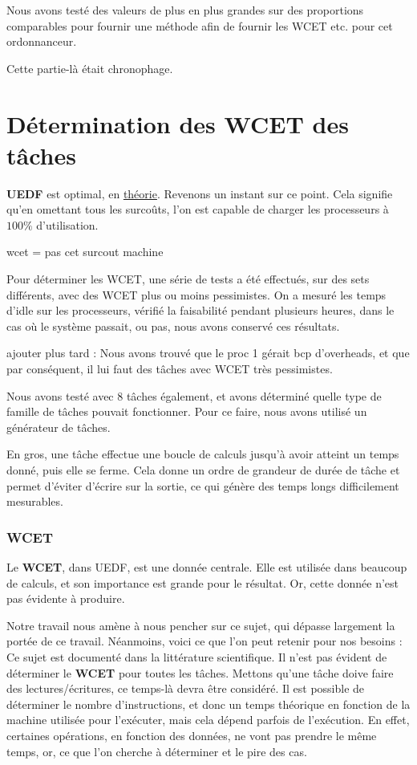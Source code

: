 	Nous avons testé des valeurs de plus en plus grandes sur des proportions comparables pour fournir 
	une méthode afin de fournir les WCET etc. pour cet ordonnanceur.
	
	Cette partie-là était chronophage.

\section{Détermination des WCET des tâches}
	\textbf{UEDF} est optimal, en \underline{théorie}. Revenons un instant sur ce point. 
	Cela signifie qu'en omettant tous les surcoûts, l'on est capable de charger les processeurs 
	à $100\%$ d'utilisation. 
	
	wcet = pas cet
	surcout
	machine

Pour déterminer les WCET, une série de tests a été effectués, sur des sets différents, 
avec des WCET plus ou moins pessimistes. 
On a mesuré les temps d'idle sur les processeurs, 
vérifié la faisabilité pendant plusieurs heures, 
dans le cas où le système passait, ou pas, nous avons conservé ces résultats.

ajouter plus tard :
Nous avons trouvé que le proc 1 gérait bcp d'overheads, et que par conséquent, il
lui faut des tâches avec WCET très pessimistes.

Nous avons testé avec 8 tâches également, et avons déterminé quelle 
type de famille de tâches pouvait fonctionner. Pour ce faire, nous avons utilisé un 
générateur de tâches.

En gros, une tâche effectue une boucle de calculs jusqu'à avoir atteint un temps donné, puis elle se ferme. 
Cela donne un ordre de grandeur de durée de tâche et permet d'éviter d'écrire sur la sortie, ce qui 
génère des temps longs difficilement mesurables.

		
\subsubsection{WCET}
Le \textbf{WCET}, dans UEDF, est une donnée centrale. Elle est utilisée dans beaucoup de calculs, et 
son importance est grande pour le résultat. Or, cette donnée n'est pas évidente à produire. \newline

Notre travail nous amène à nous pencher sur ce sujet, qui dépasse largement la portée de ce travail. 
Néanmoins, voici ce que l'on peut retenir pour nos besoins :\\
Ce sujet est documenté dans la littérature scientifique. Il n'est pas évident de déterminer le 
\textbf{WCET} pour toutes les tâches. Mettons qu'une tâche doive faire des lectures/écritures, 
ce temps-là devra être considéré. Il est possible de déterminer le nombre d'instructions, 
et donc un temps théorique en fonction de la machine utilisée pour l'exécuter, mais cela dépend 
parfois de l'exécution. En effet, certaines opérations, en fonction des données, ne vont pas prendre 
le même temps, or, ce que l'on cherche à déterminer et le pire des cas.\newline

